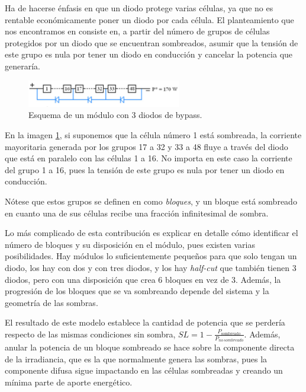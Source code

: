 Ha de hacerse énfasis en que un diodo protege varias células, ya que no es rentable económicamente poner un diodo por cada célula. El planteamiento que nos encontramos en \cite{Martínez-Moreno_Muñoz_Lorenzo_2010} consiste en, a partir del número de grupos de células protegidos por un diodo que se encuentran sombreados, asumir que la tensión de este grupo es nula por tener un diodo en conducción y cancelar la potencia que generaría.

\begin{figure}[H]
    \centering
    \includegraphics[width=0.6\textwidth]{./images/bypass_diodes/bypass_diodes.png}
    \caption{Esquema de un módulo con 3 diodos de bypass.}
    \label{fig:diodos_bypass}
\end{figure}

En la imagen \ref{fig:diodos_bypass}, si suponemos que la célula número 1 está sombreada, la corriente mayoritaria generada por los grupos 17 a 32 y 33 a 48 fluye a través del diodo que está en paralelo con las células 1 a 16. No importa en este caso la corriente del grupo 1 a 16, pues la tensión de este grupo es nula por tener un diodo en conducción.

Nótese que estos grupos se definen en \cite{Martínez-Moreno_Muñoz_Lorenzo_2010} como \textit{bloques}, y un bloque está sombreado en cuanto una de sus células recibe una fracción infinitesimal de sombra.

Lo más complicado de esta contribución es explicar en detalle cómo identificar el número de bloques y su disposición en el módulo, pues existen varias posibilidades. Hay módulos lo suficientemente pequeños para que solo tengan un diodo, los hay con dos y con tres diodos, y los hay \textit{half-cut} que también tienen 3 diodos, pero con una disposición que crea 6 bloques en vez de 3. Además, la progresión de los bloques que se va sombreando depende del sistema y la geometría de las sombras.

El resultado de este modelo establece la cantidad de potencia que se perdería respecto de las mismas condiciones sin sombra, $SL = 1 - \frac{P_\text{sombreado}}{P_{no\,sombreado}}$. Además, anular la potencia de un bloque sombreado se hace sobre la componente directa de la irradiancia, que es la que normalmente genera las sombras, pues la componente difusa sigue impactando en las células sombreadas y creando un mínima parte de aporte energético.

